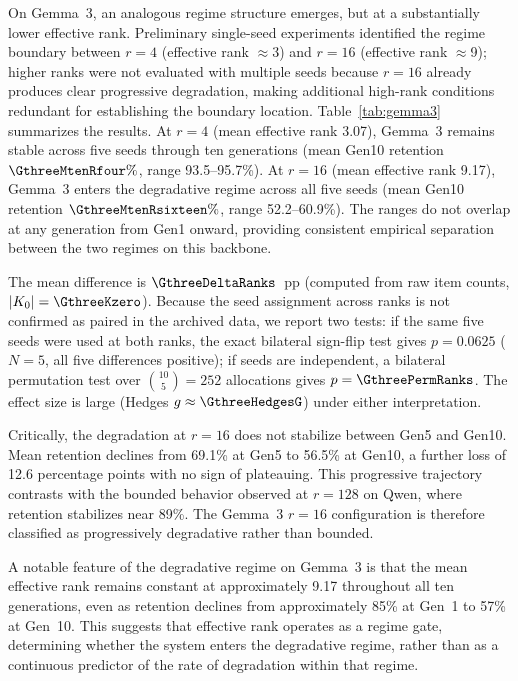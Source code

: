 \documentclass[a4paper,fleqn]{cas-dc}
\newif\ifshowchanges
\newcommand{\rev}[1]{\ifshowchanges{\color{blue}#1}\else{#1}\fi}
\begin{document}
On Gemma~3, an analogous regime structure emerges, but at a substantially lower
effective rank. Preliminary single-seed experiments identified the regime
boundary between $r=4$ (effective rank ${\approx}$3) and $r=16$ (effective rank
${\approx}$9); higher ranks were not evaluated with multiple seeds because $r=16$
already produces clear progressive degradation, making additional high-rank
conditions redundant for establishing the boundary location.
Table~\ref{tab:gemma3} summarizes the results. At $r=4$ (mean
effective rank 3.07), Gemma~3 remains stable across five seeds through ten
generations (mean Gen10 retention \rev{$\GthreeMtenRfour\%$, range 93.5--95.7\%}).
At $r=16$ (mean effective rank 9.17), Gemma~3 enters the degradative regime
across all five seeds (mean Gen10 retention \rev{$\GthreeMtenRsixteen\%$,
range 52.2--60.9\%}). The ranges do not
overlap at any generation from Gen1 onward, providing consistent empirical
separation between the two regimes on this backbone.

\rev{The mean difference is $\GthreeDeltaRanks$~pp (computed from raw item counts,
$|K_0|=\GthreeKzero$). Because the seed assignment across ranks is not confirmed
as paired in the archived data, we report two tests: if the same five seeds were
used at both ranks, the exact bilateral sign-flip test gives $p=0.0625$
($N=5$, all five differences positive); if seeds are independent, a bilateral
permutation test over $\binom{10}{5}=252$ allocations gives
$p=\GthreePermRanks$. The effect size is large (Hedges $g \approx \GthreeHedgesG$)
under either interpretation.}

Critically, the degradation at $r=16$ does not stabilize between Gen5 and
Gen10. Mean retention declines from 69.1\% at Gen5 to 56.5\% at Gen10, a
further loss of 12.6 percentage points with no sign of plateauing. This
progressive trajectory contrasts with the bounded behavior observed at $r=128$
on Qwen, where retention stabilizes near 89\%. The Gemma~3 $r=16$
configuration is therefore classified as progressively degradative rather than
bounded.

A notable feature of the degradative regime on Gemma~3 is that the mean
effective rank remains constant at approximately 9.17 throughout all ten
generations, \rev{even as retention declines from approximately 85\% at Gen~1 to 57\% at Gen~10}. This suggests that
effective rank operates as a regime gate, determining whether the system
enters the degradative regime, rather than as a continuous predictor of the
rate of degradation within that regime.
\end{document}
